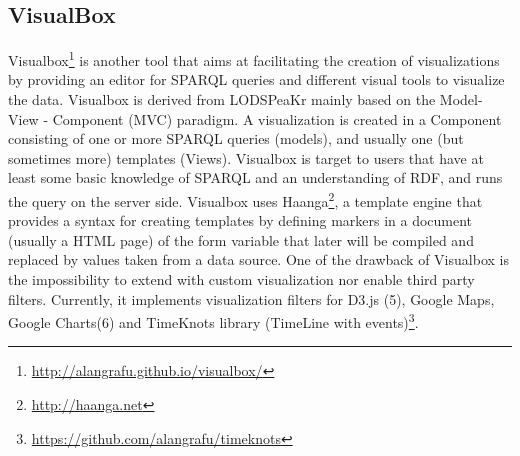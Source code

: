 
\subsection{VisualBox}

Visualbox\footnote{\url{http://alangrafu.github.io/visualbox/}} is another tool that aims at facilitating the creation of visualizations by providing an editor for SPARQL queries and different 
visual tools to visualize the data. Visualbox is derived from LODSPeaKr \cite{graves13} mainly based on the Model- View - Component (MVC) paradigm. A visualization is created in a Component consisting of one or more SPARQL queries (models), and usually one (but sometimes more) templates (Views).
Visualbox is target to users that have at least some basic knowledge of SPARQL and an understanding of RDF, and runs the query on the server side. Visualbox uses Haanga\footnote{\url{http://haanga.net}}, a template engine that provides a syntax for creating templates by defining markers in a document (usually a HTML page) of the form {{variable}} that later will be compiled and replaced by values taken from a data source. One of the drawback of Visualbox is the impossibility to extend with custom visualization nor enable third party filters.
Currently, it implements visualization filters for D3.js (5), Google Maps, Google Charts(6) and TimeKnots library (TimeLine with events)\footnote{\url{https://github.com/alangrafu/timeknots}}.

